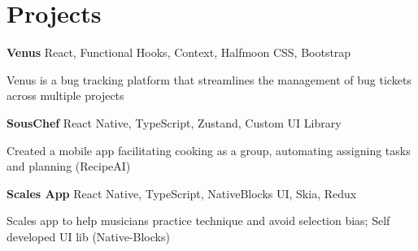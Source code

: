 
\newenvironment{twocolentry_proj}[2][]{
    \onecolentry
    \def\secondColumn{#2}
    \setcolumnwidth{\fill, 7 cm}
    \begin{paracol}{2}
}{
    \switchcolumn \raggedleft \secondColumn
    \end{paracol}
    \endonecolentry
} %

\vspace{5 pt - 0.5 cm}
\section{Projects}
\begin{twocolentry_proj}{
    \mbox{}%
}
\fontsize{11 pt}{11 pt}\textbf{Venus} React, Functional Hooks, Context, Halfmoon CSS, Bootstrap
\end{twocolentry_proj}

\begin{onecolentry}
    \begin{highlights}
        \item Venus is a bug tracking platform that streamlines the management of bug tickets across multiple projects
    \end{highlights}
\end{onecolentry}

\vspace{0.10 cm}
\begin{twocolentry_proj}{
    \mbox{}%
}
\fontsize{11 pt}{11 pt}\textbf{SousChef} React Native, TypeScript, Zustand, Custom UI Library  
\end{twocolentry_proj}
\begin{onecolentry}
    \begin{highlights}
        \item Created a mobile app facilitating cooking as a group, automating assigning tasks and planning (RecipeAI)
    \end{highlights}
\end{onecolentry}

\vspace{0.10 cm}
\begin{twocolentry_proj}{
    \mbox{}%
}
\fontsize{11 pt}{11 pt}\textbf{Scales App} React Native, TypeScript, NativeBlocks UI, Skia, Redux
\end{twocolentry_proj}
\begin{onecolentry}
    \begin{highlights}
        \item Scales app to help musicians practice technique and avoid selection bias; Self developed UI lib (Native-Blocks)
    \end{highlights}
\end{onecolentry}
